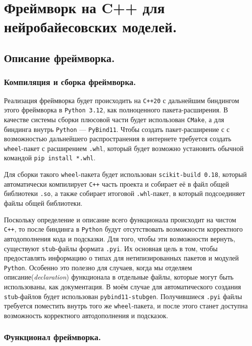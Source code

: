 \chapter{Фреймворк на C++ для нейробайесовских моделей.}
\section{Описание фреймворка.}

\subsection{Компиляция и сборка фреймворка.}

Реализация фреймворка будет происходить на \verb|C++20| с дальнейшим биндингом этого фреймворка в \verb|Python 3.12|, как полноценного пакета-расширения. В качестве
 системы сборки плюсовой части будет использован \verb|CMake|, а для биндинга внутрь \verb|Python| --- \verb|PyBind11|. Чтобы создать пакет-расширение с
 с возможностью дальнейшего распространения в интернете требуется создать \verb|wheel|-пакет с расширением \verb|.whl|, который будет возможно установить
 обычной командой \verb|pip install *.whl|.

Для сборки такого \verb|wheel|-пакета будет использован \verb|scikit-build 0.18|, который автоматически компилирует
 \verb|C++| часть проекта и собирает её в файл общей библиотеки \verb|.so|, а также собирает итоговой \verb|.whl|-пакет, в который подсоединяет файлы общей библиотеки.

Поскольку определение и описание всего функционала происходит на чистом \verb|C++|, то после биндинга в \verb|Python| будут отсутствовать возможности корректного
 автодополнения кода и подсказки. Для того, чтобы эти возможности вернуть, существуют \verb|stub|-файлы формата \verb|.pyi|. Их основная цель в том, чтобы предоставлять
 информацию о типах для нетипизированных пакетов и модулей \verb|Python|. Особенно это полезно для случаев, когда мы отделяем описание(\textit{declaration}) функционала
 в отдельные файлы, которые могут быть использованы, как документация. В моём случае для автоматического создания \verb|stub|-файлов будет использован \verb|pybind11-stubgen|.
 Получившиеся \verb|.pyi| файлы требуется поместить внутрь того же \verb|wheel|-пакета, и после этого станет доступна возможность корректного автодополнения и подсказок.

\subsection{Функционал фреймворка.}

